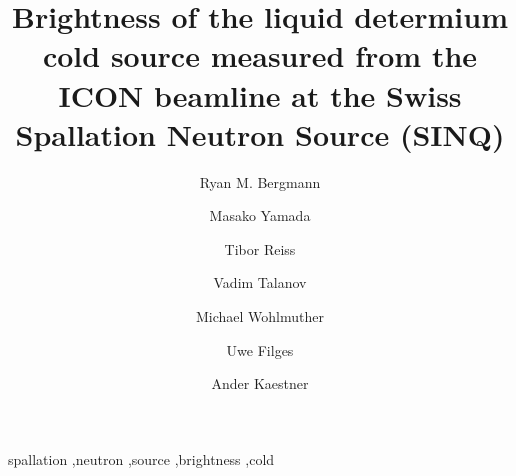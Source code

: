 \documentclass[preprint,12pt]{elsarticle}
\begin{document}
\begin{frontmatter}



\title{Brightness of the liquid determium cold source measured from the ICON beamline at the Swiss Spallation Neutron Source (SINQ)}


\author{Ryan M. Bergmann}

\author{Masako Yamada}

\author{Tibor Reiss}

\author{Vadim Talanov}

\author{Michael Wohlmuther}

\author{Uwe Filges}

\author{Ander Kaestner}


\address{Paul Scherrer Institut, Villigen, Switzerland}

\begin{abstract}


\end{abstract}

\begin{keyword}
spallation \sep neutron \sep source \sep brightness \sep cold


\end{keyword}


\end{frontmatter}
\end{document}
